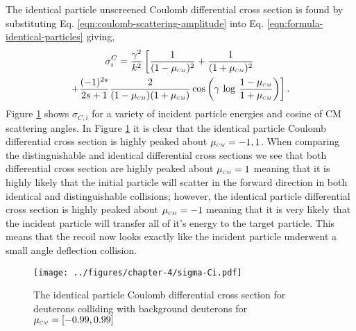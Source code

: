 The identical particle unscreened Coulomb differential cross section is found by substituting Eq. \eqref{eqn:coulomb-scattering-amplitude} into Eq. \eqref{eqn:formula-identical-particles} giving,
\begin{multline} \label{eqn:coulomb-unscreened-identical}
   \sigma_{i}^{C} = \dfrac{\gamma^2}{k^2} \left[ \dfrac{1}{(1 - \mucm)^2} + \dfrac{1}{(1 + \mucm)^2} \right. \\ \left. + \dfrac{(-1)^{2s}}{2s+1} \dfrac{2}{(1 - \mucm)(1 + \mucm)} \cos \left( \gamma \, \log \, \dfrac{1 - \mucm}{1 + \mucm} \right) \right].
\end{multline}
Figure \ref{fig:coulomb-identical} shows $\sigma_{C,i}$ for a variety of incident particle energies and cosine of CM scattering angles. In Figure \ref{fig:coulomb-identical} it is clear that the identical particle Coulomb differential cross section is highly peaked about $\mucm = -1, 1$. When comparing the distinguishable and identical differential cross sections we see that both differential cross section are highly peaked about $\mucm = 1$ meaning that it is highly likely that the initial particle will scatter in the forward direction in both identical and distinguishable collisions; however, the identical particle differential cross section is highly peaked about $\mucm = -1$ meaning that it is very likely that the incident particle will transfer all of it's energy to the target particle. This means that the recoil now looks exactly like the incident particle underwent a small angle deflection collision.
\begin{figure}[!htb]
    \centering
    \texttt{[image: ../figures/chapter-4/sigma-Ci.pdf]}
    \caption{The identical particle Coulomb differential cross section for deuterons colliding with background deuterons for $\mucm = [-0.99,0.99]$}
    \label{fig:coulomb-identical}
\end{figure}


